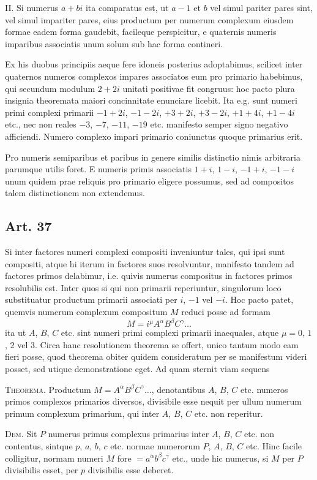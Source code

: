 \documentclass[12pt]{article}
\newcommand{\art}[1]{\subsection*{Art. #1}}
\begin{document}
II. Si numerus $a+bi$ ita comparatus est, ut $a-1$ et $b$ vel simul pariter pares sint, vel simul impariter pares, eius productum per numerum complexum eiusdem formae eadem forma gaudebit, facileque perspicitur, e quaternis numeris imparibus associatis unum solum sub hac forma contineri.

Ex his duobus principiis aeque fere idoneis posterius adoptabimus, scilicet inter quaternos numeros complexos impares associatos eum pro primario habebimus, qui secundum modulum $2+2i$ unitati positivae fit congruus: hoc pacto plura insignia theoremata maiori concinnitate enunciare licebit. Ita e.g. sunt numeri primi complexi primarii $-1+2i$, $-1-2i$, $+3+2i$, $+3-2i$, $+1+4i$, $+1-4i$ etc., nec non reales $-3$, $-7$, $-11$, $-19$ etc. manifesto semper signo negativo afficiendi. Numero complexo impari primario coniunctus quoque primarius erit.

Pro numeris semiparibus et paribus in genere similis distinctio nimis arbitraria parumque utilis foret. E numeris primis associatis $1+i$, $1-i$, $-1+i$, $-1-i$ unum quidem prae reliquis pro primario eligere possumus, sed ad compositos talem distinctionem non extendemus.

\art{37}

Si inter factores numeri complexi compositi inveniuntur tales, qui ipsi sunt compositi, atque hi iterum in factores suos resolvuntur, manifesto tandem ad factores primos delabimur, i.e. quivis numerus compositus in factores primos resolubilis est. Inter quos si qui non primarii reperiuntur, singulorum loco substituatur productum primarii associati per $i$, $-1$ vel $-i$. Hoc pacto patet, quemvis numerum complexum compositum $M$ reduci posse ad formam
\[
M=i^{\mu}A^{\alpha}B^{\beta}C^{\gamma}\ldots
\]
ita ut $A$, $B$, $C$ etc. sint numeri primi complexi primarii inaequales, atque $\mu=0$, $1$, $2$ vel $3$. Circa hanc resolutionem theorema se offert, unico tantum modo eam fieri posse, quod theorema obiter quidem consideratum per se manifestum videri posset, sed utique demonstratione eget. Ad quam sternit viam sequens

\medskip
\noindent\textsc{Theorema.} Productum $M=A^{\alpha}B^{\beta}C^{\gamma}\ldots$, denotantibus $A$, $B$, $C$ etc. numeros primos complexos primarios diversos, divisibile esse nequit per ullum numerum primum complexum primarium, qui inter $A$, $B$, $C$ etc. non reperitur.

\medskip
\noindent\textsc{Dem.} Sit $P$ numerus primus complexus primarius inter $A$, $B$, $C$ etc. non contentus, sintque $p$, $a$, $b$, $c$ etc. normae numerorum $P$, $A$, $B$, $C$ etc. Hinc facile colligitur, normam numeri $M$ fore $=a^{\alpha}b^{\beta}c^{\gamma}$ etc., unde hic numerus, si $M$ per $P$ divisibilis esset, per $p$ divisibilis esse deberet.
\end{document}
